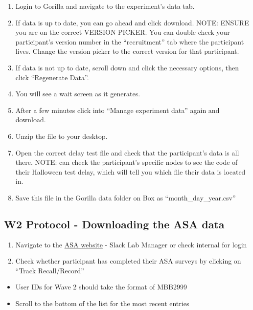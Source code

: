 \documentclass[
]{book}
\providecommand{\tightlist}{%
  \setlength{\itemsep}{0pt}\setlength{\parskip}{0pt}}
\begin{document}
\begin{enumerate}
\def\labelenumi{\arabic{enumi}.}
\item
  Login to Gorilla and navigate to the experiment's data tab.
\item
  If data is up to date, you can go ahead and click download. NOTE: ENSURE you are on the correct VERSION PICKER. You can double check your participant's version number in the ``recruitment'' tab where the participant lives. Change the version picker to the correct version for that participant.
\item
  If data is not up to date, scroll down and click the necessary options, then click ``Regenerate Data''.
\item
  You will see a wait screen as it generates.
\item
  After a few minutes click into ``Manage experiment data'' again and download.
\item
  Unzip the file to your desktop.
\item
  Open the correct delay test file and check that the participant's data is all there. NOTE: can check the participant's specific nodes to see the code of their Halloween test delay, which will tell you which file their data is located in.
\item
  Save this file in the Gorilla data folder on Box as ``month\_day\_year.csv''
\end{enumerate}

\hypertarget{w2-protocol---downloading-the-asa-data}{%
\subsection{W2 Protocol - Downloading the ASA data}\label{w2-protocol---downloading-the-asa-data}}

\begin{enumerate}
\def\labelenumi{\arabic{enumi}.}
\tightlist
\item
  Navigate to the \href{https://asa24.nci.nih.gov}{ASA website} - Slack Lab Manager or check internal for login
\item
  Check whether participant has completed their ASA surveys by clicking on ``Track Recall/Record''
\end{enumerate}

\begin{itemize}
\tightlist
\item
  User IDs for Wave 2 should take the format of MBB2999
\item
  Scroll to the bottom of the list for the most recent entries
\end{itemize}
\end{document}
